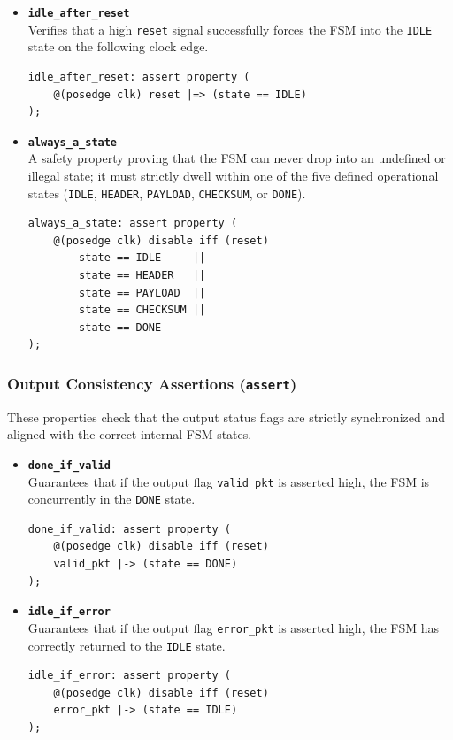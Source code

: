 \documentclass{article}
\begin{document}
\begin{itemize}
    \item \textbf{\texttt{idle\_after\_reset}} \\
    Verifies that a high \texttt{reset} signal successfully forces the FSM into the \texttt{IDLE} state on the following clock edge.
    \begin{verbatim}
idle_after_reset: assert property (
    @(posedge clk) reset |=> (state == IDLE)
);
    \end{verbatim}
    
    \item \textbf{\texttt{always\_a\_state}} \\
    A safety property proving that the FSM can never drop into an undefined or illegal state; it must strictly dwell within one of the five defined operational states (\texttt{IDLE}, \texttt{HEADER}, \texttt{PAYLOAD}, \texttt{CHECKSUM}, or \texttt{DONE}).
    \begin{verbatim}
always_a_state: assert property (
    @(posedge clk) disable iff (reset) 
        state == IDLE     ||
        state == HEADER   ||
        state == PAYLOAD  ||
        state == CHECKSUM ||
        state == DONE
);
    \end{verbatim}
\end{itemize}

\subsubsection{Output Consistency Assertions (\texttt{assert})}
These properties check that the output status flags are strictly synchronized and aligned with the correct internal FSM states.

\begin{itemize}
    \item \textbf{\texttt{done\_if\_valid}} \\
    Guarantees that if the output flag \texttt{valid\_pkt} is asserted high, the FSM is concurrently in the \texttt{DONE} state.
    \begin{verbatim}
done_if_valid: assert property (
    @(posedge clk) disable iff (reset) 
    valid_pkt |-> (state == DONE)
);
    \end{verbatim}
    
    \item \textbf{\texttt{idle\_if\_error}} \\
    Guarantees that if the output flag \texttt{error\_pkt} is asserted high, the FSM has correctly returned to the \texttt{IDLE} state.
    \begin{verbatim}
idle_if_error: assert property (
    @(posedge clk) disable iff (reset) 
    error_pkt |-> (state == IDLE)
);
    \end{verbatim}
\end{itemize}
\end{document}
